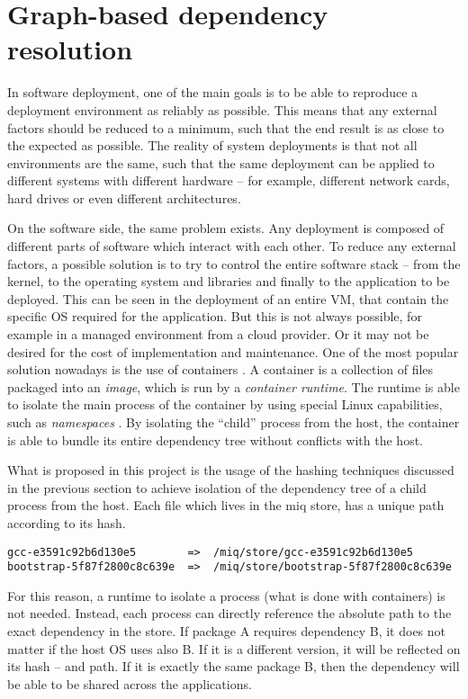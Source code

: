 \FloatBarrier
\section{Graph-based dependency resolution}

In software deployment, one of the main goals is to be
able to reproduce a deployment environment as reliably as
possible. This means that any external factors should be
reduced to a minimum, such that the end result is as close
to the expected as possible. The reality of system
deployments is that not all environments are the same, such
that the same deployment can be applied to different systems
with different hardware -- for example, different network
cards, hard drives or even different architectures.

On the software side, the same problem exists. Any
deployment is composed of different parts of software which
interact with each other. To reduce any external factors,
a possible solution is to try to control the entire software
stack -- from the kernel, to the operating system and
libraries and finally to the application to be deployed.
This can be seen in the deployment of an entire \ac{VM}, that
contain the specific OS required for the application. But
this is not always possible, for example in a managed
environment from a cloud provider. Or it may not be desired
for the cost of implementation and maintenance. One of the
most popular solution nowadays is the use of containers
\cite{DockerAcceleratedContainerized2022}. A container is a
collection of files packaged into an \textit{image}, which is
run by a \textit{container runtime}. The runtime is able to
isolate the main process of the container by using special
Linux capabilities, such as \textit{namespaces}
\cite{NamespacesLinuxManualb}. By isolating the ``child''
process from the host, the container is able to bundle its
entire dependency tree without conflicts with the host.

What is proposed in this project is the usage of the hashing
techniques discussed in the previous section to achieve
isolation of the dependency tree of a child process from the
host. Each file which lives in the miq store, has a unique
path according to its hash.

\begin{verbatim}
gcc-e3591c92b6d130e5        =>  /miq/store/gcc-e3591c92b6d130e5
bootstrap-5f87f2800c8c639e  =>  /miq/store/bootstrap-5f87f2800c8c639e
\end{verbatim}

For this reason, a runtime to isolate a process (what is
done with containers) is not needed. Instead, each process
can directly reference the absolute path to the exact
dependency in the store. If package A requires dependency B,
it does not matter if the host \ac{OS} uses also B. If it is
a different version, it will be reflected on its hash -- and
path. If it is exactly the same package B, then the
dependency will be able to be shared across the applications.

